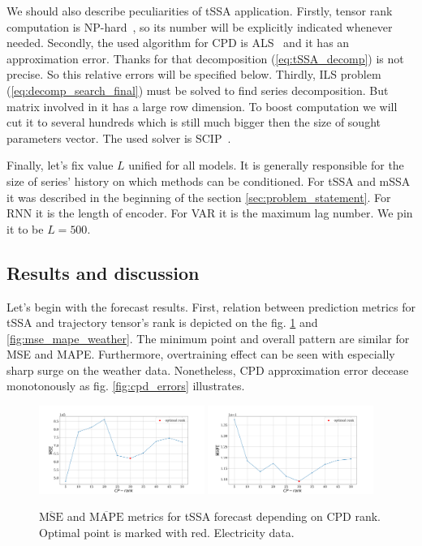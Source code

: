 \documentclass[referee, pdflatex]{sn-jnl}
\theoremstyle{definition}
\theoremstyle{plain}
\begin{document}
	We should also describe peculiarities of tSSA application. Firstly, tensor rank computation is NP-hard~\cite{HASTAD1990644}, so its number will be explicitly indicated whenever needed. Secondly, the used algorithm for CPD is ALS~\cite{kolda_tensors} and it has an approximation error. Thanks for that decomposition (\ref{eq:tSSA_decomp}) is not precise. So this relative errors will be specified below. Thirdly, ILS problem (\ref{eq:decomp_search_final}) must be solved to find series decomposition. But matrix involved in it has a large row dimension. To boost computation we will cut it to several hundreds which is still much bigger then the size of sought parameters vector. The used solver is SCIP~\cite{BolusaniEtal2024ZR}.

	Finally, let's fix value $ L $ unified for all models. It is generally responsible for the size of series' history on which methods can be conditioned. For tSSA and mSSA it was described in the beginning of the section \ref{sec:problem_statement}. For RNN it is the length of encoder. For VAR it is the maximum lag number. We pin it to be $ L = 500 $.
	
	\subsection{Results and discussion}
	
	Let's begin with the forecast results. First, relation between prediction metrics for tSSA and trajectory tensor's rank is depicted on the fig. \ref{fig:mse_mape_electr} and \ref{fig:mse_mape_weather}. The minimum point and overall pattern are similar for MSE and MAPE. Furthermore, overtraining effect can be seen with especially sharp surge on the weather data. Nonetheless, CPD approximation error decease monotonously as fig. \ref{fig:cpd_errors} illustrates.
	
	\begin{figure}[h]
		\centering
		\includegraphics[width=0.48\textwidth, keepaspectratio]{../../experiments/electricity/tssa/figs/prediction/MSE_rank.png}
		\includegraphics[width=0.48\textwidth, keepaspectratio]{../../experiments/electricity/tssa/figs/prediction/MAPE_rank.png}
		\caption{$ \overline{\text{MSE}} $ and $ \overline{\text{MAPE}} $ metrics for tSSA forecast depending on CPD rank. Optimal point is marked with red. Electricity data.}\label{fig:mse_mape_electr}
	\end{figure}
	
\end{document}

